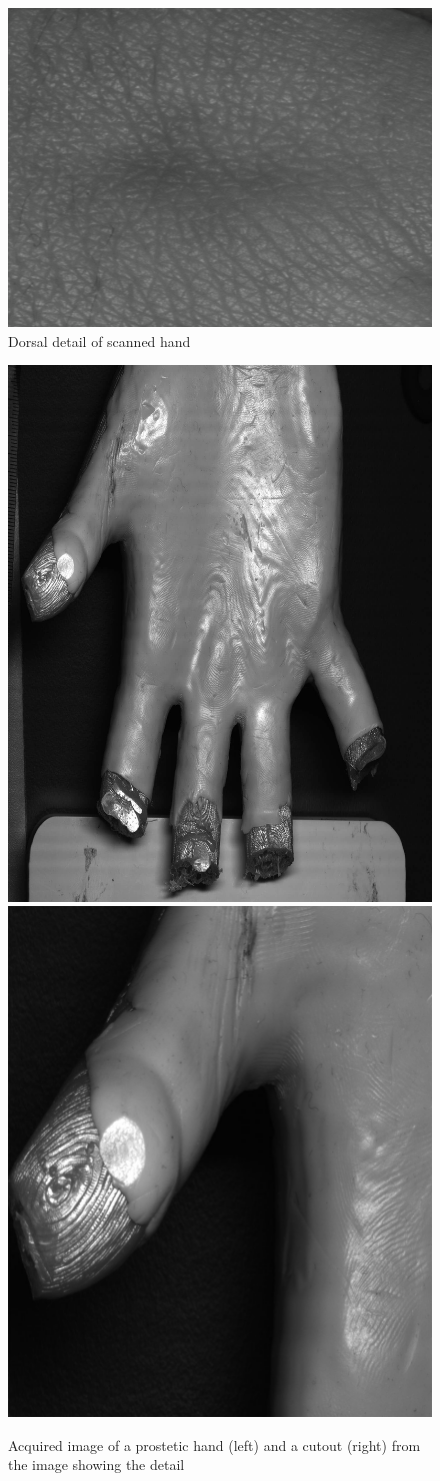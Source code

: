 \documentclass[11pt,a4paper]{article}
\begin{document}
\begin{figure}[ht!]
    \label{fig:hand-detail}
    \centering
    \includegraphics[width=0.5\linewidth]{hand-detail.jpg}
    \caption{Dorsal detail of scanned hand}
\end{figure}

\begin{figure}[ht!]
    \label{fig:prostetic-detail}
    \centering
    \includegraphics[width=0.425\linewidth]{prostetic.jpg}
    \includegraphics[width=0.45\linewidth]{prostetic-detail.jpg}
    \caption{Acquired image of a prostetic hand (left) and a cutout (right) from the image showing the detail}
\end{figure}
\end{document}
